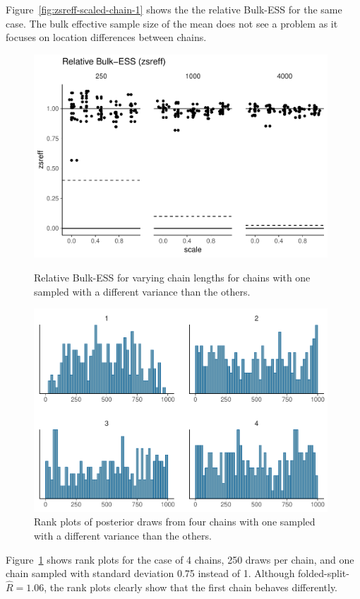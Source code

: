 \documentclass[american,]{article}
\begin{document}
Figure~\ref{fig:zsreff-scaled-chain-1} shows the the relative Bulk-ESS
for the same case. The bulk effective sample
size of the mean does not see a problem as it focuses on location
differences between chains.
\begin{figure}[tp]
  \centering
  \begin{minipage}{0.48\textwidth}
  \includegraphics[width=0.98\textwidth]{graphics/zsreff-scaled-chain-1.pdf}
  \caption{Relative Bulk-ESS for varying chain lengths for chains with
    one sampled with a different variance than the others.}
  \label{fig:zsreff-scaled-chain-1}
\end{minipage}
\hfill
  \begin{minipage}{0.48\textwidth}
  \includegraphics[width=0.98\textwidth]{graphics/hist-scaled-chain-1.pdf}
  \caption{Rank plots of posterior draws from four chains with
    one sampled with a different variance than the others.}
  \label{fig:hist-scaled-chain-1}
\end{minipage}
\end{figure}
Figure~\ref{fig:hist-scaled-chain-1} shows rank plots for the case of
4 chains, 250 draws per chain, and one chain sampled with standard
deviation 0.75 instead of 1. Although
folded-split-\(\widehat{R} = 1.06\), the rank plots clearly show that
the first chain behaves differently.
\end{document}
